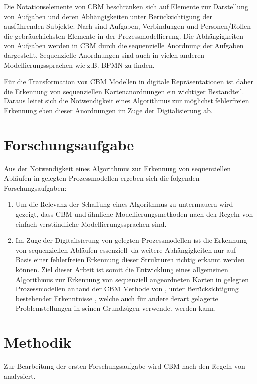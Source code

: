 Die Notationselemente von CBM beschränken sich auf Elemente zur Darstellung von Aufgaben und deren Abhängigkeiten unter Berücksichtigung der ausführenden Subjekte. Nach \citet{Muehlen2013} sind Aufgaben, Verbindungen und Personen/Rollen die gebräuchlichsten Elemente in der Prozessmodellierung. Die Abhängigkeiten von Aufgaben werden in CBM durch die sequenzielle Anordnung der Aufgaben dargestellt. Sequenzielle Anordnungen sind auch in vielen anderen Modellierungssprachen wie z.B. BPMN zu finden.

Für die Transformation von CBM Modellen in digitale Repräsentationen ist daher die Erkennung von sequenziellen Kartenanordnungen ein wichtiger Bestandteil. Daraus leitet sich die Notwendigkeit eines Algorithmus zur möglichst fehlerfreien Erkennung eben dieser Anordnungen im Zuge der Digitalisierung ab.

\section{Forschungsaufgabe} %
\label{sec:forschungsaufgabe}
Aus der Notwendigkeit eines Algorithmus zur Erkennung von sequenziellen Abläufen in gelegten Prozessmodellen ergeben sich die folgenden Forschungsaufgaben:

\begin{enumerate}
	\item Um die Relevanz der Schaffung eines Algorithmus zu untermauern wird gezeigt, dass CBM und ähnliche Modellierungsmethoden nach den Regeln von \citet{MENDLING2010127} einfach verständliche Modellierungssprachen sind.
	\item Im Zuge der Digitalisierung von gelegten Prozessmodellen ist die Erkennung von sequenziellen Abläufen essenziell, da weitere Abhängigkeiten nur auf Basis einer fehlerfreien Erkennung dieser Strukturen richtig erkannt werden können. Ziel dieser Arbeit ist somit die Entwicklung eines allgemeinen Algorithmus zur Erkennung von sequenziell angeordneten Karten in gelegten Prozessmodellen anhand der CBM Methode von \citet{oppl2016linking}, unter Berücksichtigung bestehender Erkenntnisse \cite{max}, welche auch für andere derart gelagerte Problemstellungen in seinen Grundzügen verwendet werden kann.
\end{enumerate}

\section{Methodik} %
\label{sec:methodik}
Zur Bearbeitung der ersten Forschungsaufgabe wird CBM nach den Regeln von \citet{MENDLING2010127} analysiert.

